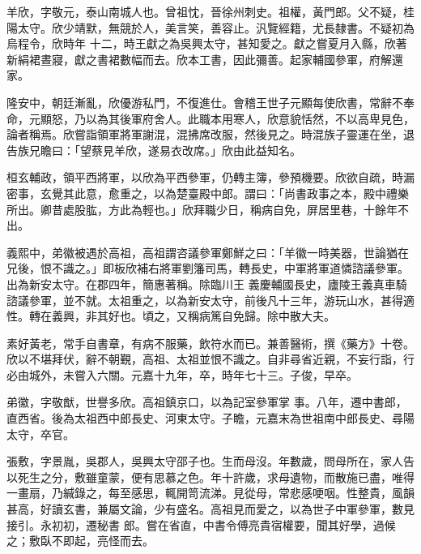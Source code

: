 
\begin{pinyinscope}

 羊欣，字敬元，泰山南城人也。曾祖忱，晉徐州刺史。祖權，黃門郎。父不疑，桂陽太守。欣少靖默，無競於人，美言笑，善容止。汎覽經籍，尤長隸書。不疑初為烏程令，欣時年
 十二，時王獻之為吳興太守，甚知愛之。獻之嘗夏月入縣，欣著新絹裙晝寢，獻之書裙數幅而去。欣本工書，因此彌善。起家輔國參軍，府解還家。



 隆安中，朝廷漸亂，欣優游私門，不復進仕。會稽王世子元顯每使欣書，常辭不奉命，元顯怒，乃以為其後軍府舍人。此職本用寒人，欣意貌恬然，不以高卑見色，論者稱焉。欣嘗詣領軍將軍謝混，混拂席改服，然後見之。時混族子靈運在坐，退告族兄瞻曰：「望蔡見羊欣，遂易衣改席。」欣由此益知名。



 桓玄輔政，領平西將軍，以欣為平西參軍，仍轉主簿，參預機要。欣欲自疏，時漏密事，玄覺其此意，愈重之，以為楚臺殿中郎。謂曰：「尚書政事之本，殿中禮樂所出。卿昔處股肱，方此為輕也。」欣拜職少日，稱病自免，屏居里巷，十餘年不出。



 義熙中，弟徽被遇於高祖，高祖謂咨議參軍鄭鮮之曰：「羊徽一時美器，世論猶在兄後，恨不識之。」即板欣補右將軍劉籓司馬，轉長史，中軍將軍道憐諮議參軍。出為新安太守。在郡四年，簡惠著稱。除臨川王
 義慶輔國長史，廬陵王義真車騎諮議參軍，並不就。太祖重之，以為新安太守，前後凡十三年，游玩山水，甚得適性。轉在義興，非其好也。頃之，又稱病篤自免歸。除中散大夫。



 素好黃老，常手自書章，有病不服藥，飲符水而已。兼善醫術，撰《藥方》十卷。欣以不堪拜伏，辭不朝覲，高祖、太祖並恨不識之。自非尋省近親，不妄行詣，行必由城外，未嘗入六關。元嘉十九年，卒，時年七十三。子俊，早卒。



 弟徽，字敬猷，世譽多欣。高祖鎮京口，以為記室參軍掌
 事。八年，遷中書郎，直西省。後為太祖西中郎長史、河東太守。子瞻，元嘉末為世祖南中郎長史、尋陽太守，卒官。



 張敷，字景胤，吳郡人，吳興太守邵子也。生而母沒。年數歲，問母所在，家人告以死生之分，敷雖童蒙，便有思慕之色。年十許歲，求母遺物，而散施已盡，唯得一畫扇，乃緘錄之，每至感思，輒開笥流涕。見從母，常悲感哽咽。性整貴，風韻甚高，好讀玄書，兼屬文論，少有盛名。高祖見而愛之，以為世子中軍參軍，數見接引。永初初，遷秘書
 郎。嘗在省直，中書令傅亮貴宿權要，聞其好學，過候之；敷臥不即起，亮怪而去。




\end{pinyinscope}
